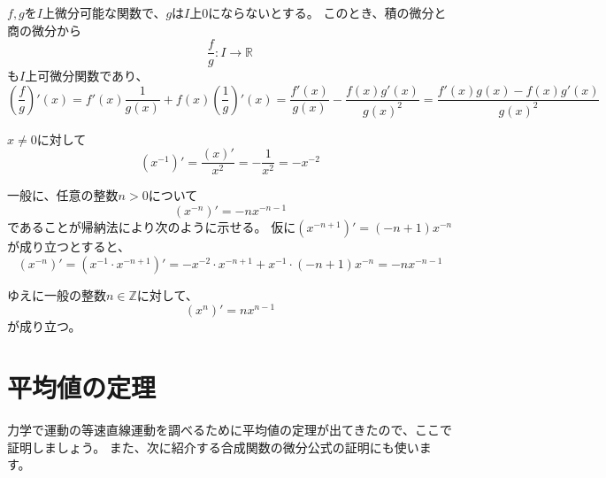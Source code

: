 \begin{example}
  $f,g$を$I$上微分可能な関数で、$g$は$I$上0にならないとする。
  このとき、積の微分と商の微分から
  \[
    \frac{f}{g}:I\to\mathbb{R}
  \]
  も$I$上可微分関数であり、
  \[
    \left(\frac{f}{g}\right)'(x)=f'(x)\frac{1}{g(x)}+f(x)\left(\frac{1}{g}\right)'(x)=\frac{f'(x)}{g(x)}-\frac{f(x)g'(x)}{g(x)^2}=\frac{f'(x)g(x)-f(x)g'(x)}{g(x)^2}
  \]
\end{example}

\begin{example}
  $x\neq0$に対して
  \[
    (x^{-1})'=\frac{(x)'}{x^2}=-\frac{1}{x^2}=-x^{-2}
  \]

  一般に、任意の整数$n>0$について
  \[
    (x^{-n})'=-nx^{-n-1}
  \]
  であることが帰納法により次のように示せる。
  仮に$(x^{-n+1})'=(-n+1)x^{-n}$が成り立つとすると、
  \[
    (x^{-n})'=(x^{-1}\cdot x^{-n+1})'=-x^{-2}\cdot x^{-n+1}+x^{-1}\cdot(-n+1)x^{-n}=-nx^{-n-1}
  \]

  ゆえに一般の整数$n\in\mathbb{Z}$に対して、
  \[
    (x^n)'=nx^{n-1}
  \]
  が成り立つ。
\end{example}



\section{平均値の定理}\label{sec:mean-value-theorem}

力学で運動の等速直線運動を調べるために平均値の定理が出てきたので、ここで証明しましょう。
また、次に紹介する合成関数の微分公式の証明にも使います。

